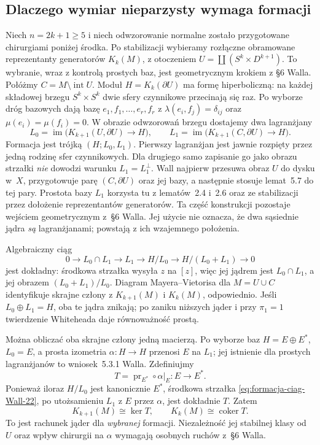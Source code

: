 \subsection*{Dlaczego wymiar nieparzysty wymaga formacji}
Niech $n=2k+1\geq5$ i niech odwzorowanie normalne
zostało przygotowane chirurgiami poniżej
środka. Po stabilizacji wybieramy rozłączne
obramowane reprezentanty generatorów
$K_k(M)$, z otoczeniem
$U=\coprod(S^k\times D^{k+1})$.
To wybranie, wraz z kontrolą prostych baz,
jest geometrycznym krokiem z §6 Walla.
Połóżmy $C=\overline{M\setminus\operatorname{int}U}$.
Moduł $H=K_k(\partial U)$ ma formę
hiperboliczną: na każdej składowej brzegu
$S^k\times S^k$ dwie sfery czynnikowe
przecinają się raz. Po wyborze dróg bazowych
dają bazę $e_1,f_1,\ldots,e_r,f_r$ z
$\lambda(e_i,f_j)=\delta_{ij}$ oraz
$\mu(e_i)=\mu(f_i)=0$.
W obrazie odwzorowań brzegu dostajemy
dwa lagranżjany
\[
 L_0=\operatorname{im}\bigl(K_{k+1}(U,\partial U)
                  \to H\bigr),\qquad
 L_1=\operatorname{im}\bigl(K_{k+1}(C,\partial U)
                  \to H\bigr).
\]
Formacja jest trójką $(H;L_0,L_1)$.
Pierwszy lagranżjan jest jawnie rozpięty przez
jedną rodzinę sfer czynnikowych. Dla drugiego
samo zapisanie go jako obrazu strzałki
\emph{nie} dowodzi warunku $L_1=L_1^\perp$.
Wall najpierw przesuwa obraz $U$ do dysku w~$X$,
przygotowuje parę $(C,\partial U)$ oraz jej
bazy, a następnie stosuje lemat~5.7 do tej pary.
Prostota bazy $L_1$ korzysta tu z lematów~2.4
i~2.6 oraz ze stabilizacji przez dołożenie
reprezentantów generatorów. Ta część konstrukcji
pozostaje wejściem geometrycznym z~§6 Walla.
Jej użycie nie oznacza, że dwa sąsiednie
jądra \emph{są} lagranżjanami; powstają
z ich wzajemnego położenia.

Algebraiczny ciąg
\begin{equation}\label{eq:formacja-ciag-Wall-22}
 0\longrightarrow L_0\cap L_1
 \longrightarrow L_1
 \longrightarrow H/L_0
 \longrightarrow H/(L_0+L_1)
 \longrightarrow0
\end{equation}
jest dokładny: środkowa strzałka wysyła
$z$ na $[z]$, więc jej jądrem jest
$L_0\cap L_1$, a jej obrazem
$(L_0+L_1)/L_0$.
Diagram Mayera--Vietorisa dla $M=U\cup C$
identyfikuje skrajne człony z
$K_{k+1}(M)$ i $K_k(M)$, odpowiednio.
Jeśli $L_0\oplus L_1=H$, oba te jądra
znikają; po zaniku niższych jąder i
przy $\pi_1=1$ twierdzenie Whiteheada
daje równoważność prostą.

Można obliczać oba skrajne człony jedną
macierzą. Po wyborze baz $H=E\oplus E^*$,
$L_0=E$, a prosta izometria $\alpha:H\to H$
przenosi $E$ na $L_1$; jej istnienie dla
prostych lagranżjanów to wniosek~5.3.1 Walla.
Zdefiniujmy
\[
 T=\operatorname{pr}_{E^*}\circ\alpha|_E:
 E\longrightarrow E^*.
\]
Ponieważ iloraz $H/L_0$ jest kanonicznie
$E^*$, środkowa strzałka
\eqref{eq:formacja-ciag-Wall-22}, po
utożsamieniu $L_1$ z $E$ przez $\alpha$,
jest dokładnie $T$. Zatem
\[
 K_{k+1}(M)\cong\ker T,\qquad
 K_k(M)\cong\operatorname{coker}T.
\]
To jest rachunek jąder dla \emph{wybranej}
formacji. Niezależność jej stabilnej klasy
od $U$ oraz wpływ chirurgii na $\alpha$
wymagają osobnych ruchów z~§6 Walla.

